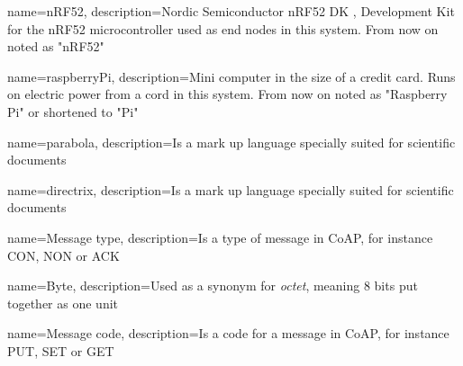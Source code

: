 \pagestyle{empty}



{
	name=nRF52,
    description={Nordic Semiconductor nRF52 DK , Development Kit for the nRF52 microcontroller used as end nodes in this system. From now on noted as "nRF52"}
}

{
	name=raspberryPi,
    description={Mini computer in the size of a credit card. Runs on electric power from a cord in this system. From now on noted as "Raspberry Pi" or shortened to "Pi"}
}


{
    name=parabola,
    description={Is a mark up language specially suited 
    for scientific documents}
}

{
    name=directrix,
    description={Is a mark up language specially suited 
    for scientific documents}
}

{
    name=Message type,
    description={Is a type of message in CoAP, for instance CON, NON or ACK}
}

{
    name=Byte,
    description={Used as a synonym for \textit{octet}, meaning 8 bits put together as one unit}
}

{
    name=Message code,
    description={Is a code for a message in CoAP, for instance PUT, SET or GET}
}












